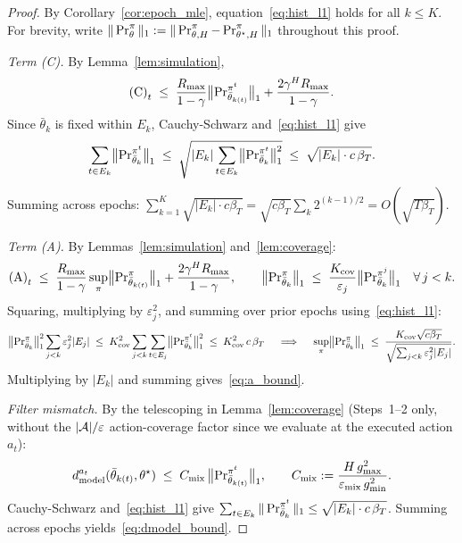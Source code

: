 \begin{proof}
By Corollary~\ref{cor:epoch_mle}, equation~\eqref{eq:hist_l1} holds for all $k\le K$.
For brevity, write $\|\operatorname{Pr}_{\theta}^{\pi}\|_1:=\|\operatorname{Pr}_{\theta,H}^{\pi}-\operatorname{Pr}_{\theta^\star,H}^{\pi}\|_1$ throughout this proof.

\emph{Term (C).} By Lemma~\ref{lem:simulation},
\[
\text{(C)}_t\;\le\; \frac{R_{\max}}{1-\gamma}\bigl\|\operatorname{Pr}_{\bar\theta_{k(t)}}^{\pi^t}\bigr\|_1+\frac{2\gamma^H R_{\max}}{1-\gamma}. 
\]
Since $\bar\theta_k$ is fixed within $E_k$, Cauchy-Schwarz and~\eqref{eq:hist_l1} give 
\[
\sum_{t\in E_k}\bigl\|\operatorname{Pr}_{\bar\theta_k}^{\pi^t}\bigr\|_1
\;\le\;\sqrt{|E_k|\sum_{t\in E_k}\bigl\|\operatorname{Pr}_{\bar\theta_k}^{\pi^t}\bigr\|_1^2}
\;\le\;\sqrt{|E_k|\cdot c\,\beta_T}.
\]
Summing across epochs: $\sum_{k=1}^K\sqrt{|E_k|\cdot c\beta_T}=\sqrt{c\beta_T}\sum_k 2^{(k-1)/2}=O(\sqrt{T\beta_T})$.

\emph{Term (A).} By Lemmas~\ref{lem:simulation} and~\ref{lem:coverage}:
\[
\text{(A)}_t\;\le\;\frac{R_{\max}}{1-\gamma}\sup_\pi\bigl\|\operatorname{Pr}_{\bar\theta_{k(t)}}^{\pi}\bigr\|_1+\frac{2\gamma^H R_{\max}}{1-\gamma},
\qquad
\bigl\|\operatorname{Pr}_{\bar\theta_k}^{\pi}\bigr\|_1\;\le\;\frac{K_{\mathrm{cov}}}{\varepsilon_j}\bigl\|\operatorname{Pr}_{\bar\theta_k}^{\pi^j}\bigr\|_1\quad\forall\,j<k.
\]
Squaring, multiplying by $\varepsilon_j^2$, and summing over prior epochs using~\eqref{eq:hist_l1}:
\[
\bigl\|\operatorname{Pr}_{\bar\theta_k}^{\pi}\bigr\|_1^2\sum_{j<k}\varepsilon_j^2|E_j|
\;\le\; K_{\mathrm{cov}}^2\sum_{j<k}\sum_{t\in E_j}\bigl\|\operatorname{Pr}_{\bar\theta_k}^{\pi^t}\bigr\|_1^2
\;\le\; K_{\mathrm{cov}}^2\,c\,\beta_T
\quad\implies\quad
\sup_\pi\bigl\|\operatorname{Pr}_{\bar\theta_k}^{\pi}\bigr\|_1\;\le\;\frac{K_{\mathrm{cov}}\sqrt{c\beta_T}}{\sqrt{\sum_{j<k}\varepsilon_j^2|E_j|}}.
\]
Multiplying by $|E_k|$ and summing gives~\eqref{eq:a_bound}.

\emph{Filter mismatch.}
By the telescoping in Lemma~\ref{lem:coverage} (Steps~1--2 only, without the $|{\mathcal{A}}|/\varepsilon$ action-coverage factor since we evaluate at the executed action $a_t$):
\[
d_{\mathrm{model}}^{a_t}(\bar\theta_{k(t)},\theta^\star)
\;\le\;
C_{\mathrm{mix}}\,\bigl\|\operatorname{Pr}_{\bar\theta_{k(t)}}^{\pi^t}\bigr\|_1,
\qquad C_{\mathrm{mix}}:=\frac{H\,g_{\max}^2}{\varepsilon_{\mathrm{mix}}\,g_{\min}^2}.
\]
Cauchy-Schwarz and~\eqref{eq:hist_l1} give $\sum_{t\in E_k}\|\operatorname{Pr}_{\bar\theta_k}^{\pi^t}\|_1\le\sqrt{|E_k|\cdot c\,\beta_T}$. Summing across epochs yields~\eqref{eq:dmodel_bound}.
\end{proof}


